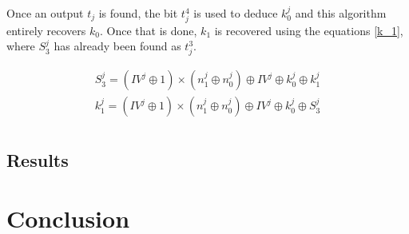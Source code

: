\documentclass[a4paper,11pt,twocolumn]{article}
\begin{document}
		Once an output $t_j$ is found, the bit $t_j^4$ is used to deduce $k_0^j$ and this algorithm entirely recovers $k_0$. Once that is done, $k_1$ is recovered using the equations \ref{k_1}, where $S_3^j$ has already been found as $t_j^3$.
		
		\begin{gather*} \label{k_1}
			S_3^j = (IV^j \oplus 1) \times (n_1^j \oplus n_0^j) \oplus IV^j \oplus k_0^j \oplus k_1^j\\
			k_1^j = (IV^j \oplus 1) \times (n_1^j \oplus n_0^j) \oplus IV^j \oplus k_0^j \oplus S_3^j\\
		\end{gather*}
		
		\subsection{Results}
		
		\section{Conclusion}
		
		\appendix
		
		 
		
		
\end{document}
